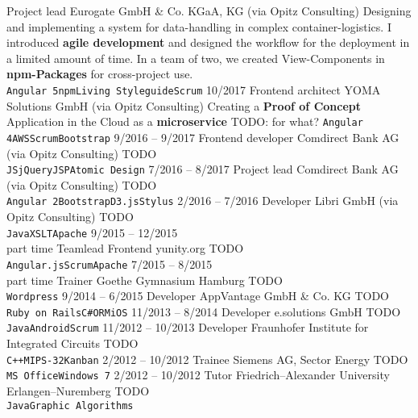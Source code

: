 \documentclass[9pt]{developercv} %
\begin{document}
\begin{entrylist}
		{Project lead}
		{Eurogate GmbH \& Co. KGaA, KG (via Opitz Consulting)}
		{
      Designing and implementing a system for data-handling in complex container-logistics. I introduced \textbf{agile development} and designed
      the workflow for the deployment in a limited amount of time. In a team of two, we created View-Components in \textbf{npm-Packages} for
      cross-project use.\\ 
      \texttt{Angular 5}\slashsep\texttt{npm}\slashsep\texttt{Living Styleguide}\slashsep\texttt{Scrum}
    }
  \entry
		{10/2017}
		{Frontend architect}
		{YOMA Solutions GmbH (via Opitz Consulting)}
		{
      Creating a \textbf{Proof of Concept} Application in the Cloud as a \textbf{microservice} TODO: for what?
      \texttt{Angular 4}\slashsep\texttt{AWS}\slashsep\texttt{Scrum}\slashsep\texttt{Bootstrap}
    }
  \entry
		{9/2016 -- 9/2017}
		{Frontend developer}
		{Comdirect Bank AG (via Opitz Consulting)}
		{
      TODO\\
      \texttt{JS}\slashsep\texttt{jQuery}\slashsep\texttt{JSP}\slashsep\texttt{Atomic Design}
    }
  \entry
		{7/2016 -- 8/2017}
		{Project lead}
		{Comdirect Bank AG (via Opitz Consulting)}
		{
      TODO\\
      \texttt{Angular 2}\slashsep\texttt{Bootstrap}\slashsep\texttt{D3.js}\slashsep\texttt{Stylus}
    }
  \entry
		{2/2016 -- 7/2016}
		{Developer}
		{Libri GmbH (via Opitz Consulting)}
		{
      TODO\\
      \texttt{Java}\slashsep\texttt{XSLT}\slashsep\texttt{Apache}
    }
  \entry
		{9/2015 -- 12/2015\\\footnotesize{part time}}
		{Teamlead Frontend}
		{yunity.org}
		{
      TODO\\
      \texttt{Angular.js}\slashsep\texttt{Scrum}\slashsep\texttt{Apache}
    }
  \entry
		{7/2015 -- 8/2015\\\footnotesize{part time}}
		{Trainer}
		{Goethe Gymnasium Hamburg}
		{
      TODO\\
      \texttt{Wordpress}
    }
  \entry
		{9/2014 -- 6/2015}
		{Developer}
		{AppVantage GmbH \& Co. KG}
		{
      TODO\\
      \texttt{Ruby on Rails}\slashsep\texttt{C\#}\slashsep\texttt{ORM}\slashsep\texttt{iOS}
    }
  \entry
		{11/2013 -- 8/2014}
		{Developer}
		{e.solutions GmbH}
		{
      TODO\\
      \texttt{Java}\slashsep\texttt{Android}\slashsep\texttt{Scrum}
    }
  \entry
		{11/2012 -- 10/2013}
		{Developer}
		{Fraunhofer Institute for Integrated Circuits}
		{
      TODO\\
      \texttt{C++}\slashsep\texttt{MIPS-32}\slashsep\texttt{Kanban}
    }
  \entry
		{2/2012 -- 10/2012}
		{Trainee}
		{Siemens AG, Sector Energy}
		{
      TODO\\
      \texttt{MS Office}\slashsep\texttt{Windows 7}
    }
  \entry
		{2/2012 -- 10/2012}
		{Tutor}
		{Friedrich–Alexander University Erlangen–Nuremberg}
		{
      TODO\\
      \texttt{Java}\slashsep\texttt{Graphic Algorithms}
    }
\end{entrylist}
\end{document}
